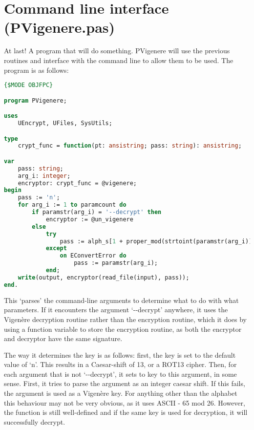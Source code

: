 \documentclass[fleqn,a4paper,11pt]{article}
\begin{document}
    \section{Command line interface (PVigenere.pas)}
    At last! A program that will do something. PVigenere will use the previous
    routines and interface with the command line to allow them to be used. The
    program is as follows:

\begin{lstlisting}[language=Pascal, caption=Command-line interface for Vigen\`ere routines (PVigenere.pas)]
{$MODE OBJFPC}

program PVigenere;

uses
    UEncrypt, UFiles, SysUtils;

type
    crypt_func = function(pt: ansistring; pass: string): ansistring;

var
    pass: string;
    arg_i: integer;
    encryptor: crypt_func = @vigenere;
begin
    pass := 'n';
    for arg_i := 1 to paramcount do
        if paramstr(arg_i) = '--decrypt' then
            encryptor := @un_vigenere
        else
            try
                pass := alph_s[1 + proper_mod(strtoint(paramstr(arg_i)), 26)];
            except
                on EConvertError do
                    pass := paramstr(arg_i);
            end;
    write(output, encryptor(read_file(input), pass));
end.
\end{lstlisting}
\iffalse $ \fi %

    This `parses' the command-line arguments to determine what to do with what
    parameters. If it encounters the argument `-{}-decrypt' anywhere, it uses the
    Vigen\`ere decryption routine rather than the encryption routine, which it
    does by using a function variable to store the encryption routine, as both
    the encryptor and decryptor have the same signature.

    The way it determines the key is as follows: first, the key is set to the
    default value of `n'. This results in a Caesar-shift of 13, or a ROT13
    cipher. Then, for each argument that is not `-{}-decrypt', it sets to key to
    this argument, in some sense. First, it tries to parse the argument as an
    integer caesar shift. If this fails, the argument is used as a Vigen\`ere
    key. For anything other than the alphabet this behaviour may not be very
    obvious, as it uses ASCII - 65 mod 26. However, the function is still
    well-defined and if the same key is used for decryption, it will
    successfully decrypt.
\end{document}
